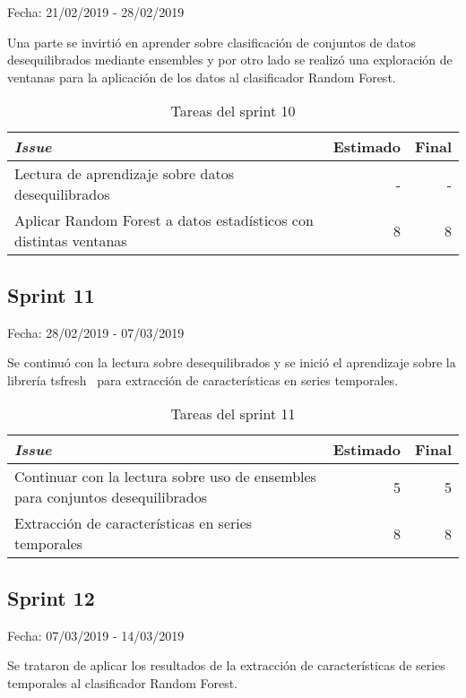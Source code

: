 Fecha: 21/02/2019 - 28/02/2019

Una parte se invirtió en aprender sobre clasificación de conjuntos de datos desequilibrados mediante ensembles y por otro lado se realizó una exploración de ventanas para la aplicación de los datos al clasificador Random Forest. 

\begin{table}[H]
	\begin{tabularx}{\textwidth}{Xrr}
		\toprule \textbf{\textit{Issue}} & \textbf{Estimado} & \textbf{Final}\\
		\toprule 
		Lectura de aprendizaje sobre datos desequilibrados & - & - \\
		Aplicar Random Forest a datos estadísticos con distintas ventanas & 8 & 8 \\
		\bottomrule
	\end{tabularx}
	\caption{Tareas del sprint 10}
\end{table}

\subsection{Sprint 11}

Fecha: 28/02/2019 - 07/03/2019

Se continuó con la lectura sobre desequilibrados y se inició el aprendizaje sobre la librería tsfresh~\cite{tsfresh} para extracción de características en series temporales.  

\begin{table}[H]
	\begin{tabularx}{\textwidth}{Xrr}
		\toprule \textbf{\textit{Issue}} & \textbf{Estimado} & \textbf{Final}\\
		\toprule
		Continuar con la lectura sobre uso de ensembles para conjuntos desequilibrados & 5 & 5 \\
		Extracción de características en series temporales & 8 & 8 \\
		\bottomrule
	\end{tabularx}
	\caption{Tareas del sprint 11}
\end{table}

\subsection{Sprint 12}

Fecha: 07/03/2019 - 14/03/2019

Se trataron de aplicar los resultados de la extracción de características de series temporales al clasificador Random Forest. 

